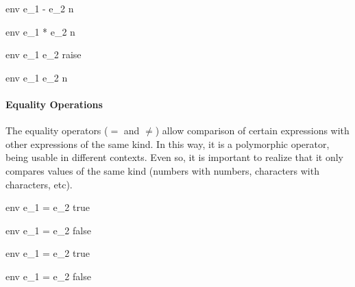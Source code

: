 \documentclass{article}
\begin{document}
    {\mbox{env} \vdash e_1 - e_2 \Downarrow n}

    {\mbox{env} \vdash e_1 * e_2 \Downarrow n}

    {\mbox{env} \vdash e_1 \div e_2 \Downarrow raise}

    {\mbox{env} \vdash e_1 \div e_2 \Downarrow n}

\paragraph{Equality Operations}
The equality operators ($=$ and $\neq$) allow comparison of certain expressions with other expressions of the same kind.
In this way, it is a polymorphic operator, being usable in different contexts.
Even so, it is important to realize that it only compares values of the same kind (numbers with numbers, characters with characters, etc).

\medskip

    {\mbox{env} \vdash e_1 = e_2 \Downarrow true}

    {\mbox{env} \vdash e_1 = e_2 \Downarrow false}

\medskip

    {\mbox{env} \vdash e_1 = e_2 \Downarrow true}

    {\mbox{env} \vdash e_1 = e_2 \Downarrow false}
\end{document}
